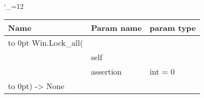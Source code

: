 \begingroup \catcode`\_=12 \tt
\begin{tabular}{lll}
\toprule
\textrm{Name}&\textrm{Param name}&\textrm{param type}\\
\midrule
\hbox to 0pt {Win.Lock_all(\hss}\\
& self\\
& assertion & int = 0\\
\hbox to 0pt{) -> None\hss}\\
\bottomrule
\end{tabular}
\endgroup

